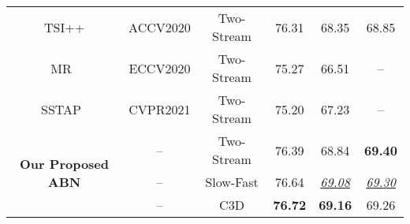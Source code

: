 \documentclass{ieeeaccess}
\begin{document}
\begin{table*}[t]
\begin{tabular}{cccccc }
TSI++ \cite{tsi_accv}       &      ACCV2020        &      Two-Stream \cite{2_stream_1}      & 76.31    & 68.35 & 68.85         \\ 
MR~\cite{MR_eccv2020} & ECCV2020 & Two-Stream \cite{2_stream_1} & 75.27 & 66.51 & -- \\
SSTAP~\cite{wang2021self} & CVPR2021 & Two-Stream \cite{2_stream_1} & 75.20 &  67.23 & --\\
\hline
\multirow{3}{*}{\textbf{Our Proposed ABN}} & --  & Two-Stream      & 76.39   & 68.84 & \textbf{69.40} \\
 & -- & Slow-Fast & 76.64       & \underline{\textit{69.08}}    &     \underline{\textit{69.30}} \\ 
 & -- & C3D       & \textbf{76.72}     & \textbf{69.16}    & 69.26  \\ 
\hline
\end{tabular}
\label{activitynet}
\end{table*}
\end{document}
